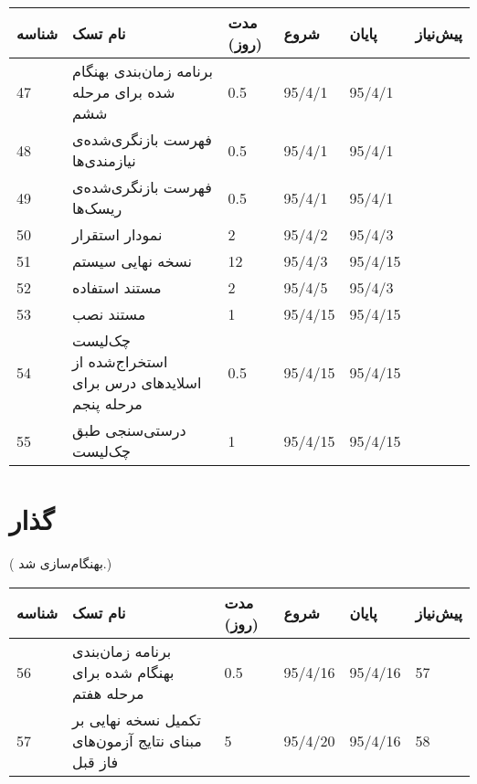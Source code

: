 \begin{tabular}[H]{ | l | l | l | l | l | l | }
	\hline
	شناسه & نام تسک & مدت (روز) & شروع & پایان & پیش‌نیاز    \\ \hline
	47 & برنامه زمان‌بندی بهنگام شده برای مرحله ششم & 0.5   &   95/4/1 &   95/4/1 &  \\ \hline
	48 &  فهرست بازنگری‌شده‌ی نیازمندی‌ها & 0.5   &   95/4/1 &   95/4/1 &  \\ \hline
	49 &  فهرست بازنگری‌شده‌ی ریسک‌ها & 0.5   &   95/4/1 &   95/4/1 &  \\ \hline
	50 & نمودار استقرار & 2   &   95/4/2 &   95/4/3 &      \\ \hline
	51 & نسخه نهایی سیستم & 12   &   95/4/3 &   95/4/15 &      \\ \hline
	52 & مستند استفاده & 2   &   95/4/5 &   95/4/3 &  \\ \hline
	53 & مستند نصب & 1   &   95/4/15 &   95/4/15 &  \\ \hline
	54 & چک‌لیست استخراج‌شده از اسلایدهای درس برای مرحله پنجم & 0.5   &   95/4/15 &   95/4/15 &  \\ \hline
	55 & درستی‌سنجی طبق  چک‌لیست  & 1   &   95/4/15 &   95/4/15 &  \\ \hline
\end{tabular}

\section{گذار}
({\color{red} بهنگام‌سازی شد.})

\begin{tabular}[H]{ | l | l | l | l | l | l | }
	\hline
	شناسه & نام تسک & مدت (روز) & شروع & پایان & پیش‌نیاز    \\ \hline
	56 & برنامه زمان‌بندی بهنگام شده برای مرحله هفتم & 0.5   &   95/4/16 &   95/4/16 & 57    \\ \hline
	57 & تکمیل نسخه نهایی بر مبنای نتایج آزمون‌های فاز قبل & 5   &   95/4/20 &   95/4/16 & 58    \\ \hline
	
\end{tabular}
\restoregeometry